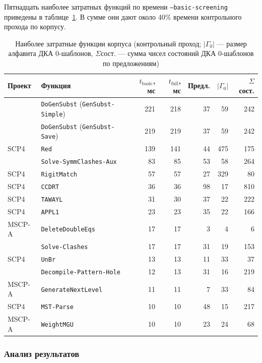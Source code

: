 Пятнадцать наиболее затратных функций по времени \texttt{--basic-screening} приведены в таблице~\ref{tab:bench-heavy}.
В сумме они дают около 40\% времени контрольного прохода по корпусу.

\begin{table}[htbp]
\centering
\caption{Наиболее затратные функции корпуса (контрольный проход; $|\Gamma_0|$ --- размер алфавита ДКА 0-шаблонов, $\Sigma$сост. --- сумма чисел состояний ДКА 0-шаблонов по предложениям)}
\label{tab:bench-heavy}
\small
\begin{tabular}{@{}llrrrrr@{}}
\toprule
Проект & Функция & $t_\mathrm{basic}$, мс & $t_\mathrm{full}$, мс & Предл. & $|\Gamma_0|$ & $\Sigma$сост. \\
\midrule
\RL{}  & \texttt{DoGenSubst} (\texttt{GenSubst-Simple}) & 221 & 218 & 37 & 59  & 242 \\
\RL{}  & \texttt{DoGenSubst} (\texttt{GenSubst-Save})   & 219 & 219 & 37 & 59  & 242 \\
SCP4   & \texttt{Red}             & 139 & 141 & 44 & 475 & 175 \\
\RL{}  & \texttt{Solve-SymmClashes-Aux} & 83 & 85 & 53 & 58 & 264 \\
SCP4   & \texttt{RigitMatch}      & 57  & 57  & 27 & 329 & 80  \\
SCP4   & \texttt{CCDRT}           & 36  & 36  & 98 & 17  & 810 \\
SCP4   & \texttt{TAWAYL}          & 31  & 30  & 37 & 22  & 222 \\
SCP4   & \texttt{APPL1}           & 23  & 23  & 35 & 22  & 166 \\
MSCP-A & \texttt{DeleteDoubleEqs} & 17  & 17  & 3  & 4   & 6   \\
\RL{}  & \texttt{Solve-Clashes}   & 17  & 17  & 31 & 19  & 153 \\
SCP4   & \texttt{UnBr}            & 13  & 13  & 11 & 33  & 37  \\
\RL{}  & \texttt{Decompile-Pattern-Hole} & 12 & 13 & 31 & 16 & 219 \\
MSCP-A & \texttt{GenerateNextLevel} & 11 & 11 & 7 & 33 & 84 \\
SCP4   & \texttt{MST-Parse}       & 10  & 10  & 48 & 15  & 217 \\
MSCP-A & \texttt{WeightMGU}       & 10  & 10  & 23 & 24  & 68  \\
\bottomrule
\end{tabular}
\end{table}
\subsubsection{Анализ результатов}

